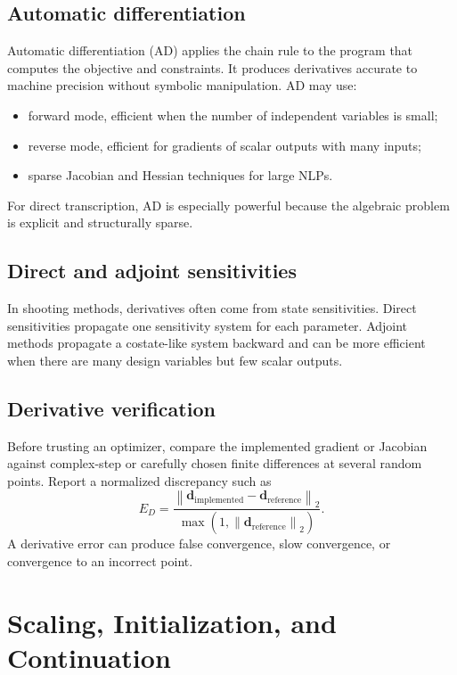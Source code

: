 \documentclass[11pt]{article}
\newcommand{\vect}[1]{\boldsymbol{#1}}
\newcommand{\normtwo}[1]{\left\lVert #1 \right\rVert_2}
\begin{document}
\subsection{Automatic differentiation}

Automatic differentiation (AD) applies the chain rule to the program that computes the objective and constraints. It produces derivatives accurate to machine precision without symbolic manipulation. AD may use:
\begin{itemize}[leftmargin=1.4em]
  \item forward mode, efficient when the number of independent variables is small;
  \item reverse mode, efficient for gradients of scalar outputs with many inputs;
  \item sparse Jacobian and Hessian techniques for large NLPs.
\end{itemize}

For direct transcription, AD is especially powerful because the algebraic problem is explicit and structurally sparse.

\subsection{Direct and adjoint sensitivities}

In shooting methods, derivatives often come from state sensitivities. Direct sensitivities propagate one sensitivity system for each parameter. Adjoint methods propagate a costate-like system backward and can be more efficient when there are many design variables but few scalar outputs.

\subsection{Derivative verification}

Before trusting an optimizer, compare the implemented gradient or Jacobian against complex-step or carefully chosen finite differences at several random points. Report a normalized discrepancy such as
\begin{equation}
E_D=\frac{\normtwo{\vect{d}_{\mathrm{implemented}}-\vect{d}_{\mathrm{reference}}}}
{\max\left(1,\normtwo{\vect{d}_{\mathrm{reference}}}\right)}.
\end{equation}
A derivative error can produce false convergence, slow convergence, or convergence to an incorrect point.

\section{Scaling, Initialization, and Continuation}
\end{document}
